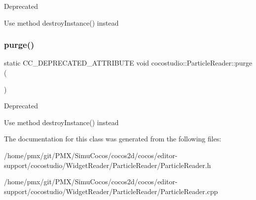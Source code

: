 \begin{DoxyRefDesc}{Deprecated}
\item[\hyperlink{deprecated__deprecated000098}{Deprecated}]Use method destroy\+Instance() instead \end{DoxyRefDesc}
\mbox{\label{classcocostudio_1_1ParticleReader_a673cbfc148ac6e11b405d3a8b2ed2603}} 
\subsubsection{\texorpdfstring{purge()}{purge()}\hspace{0.1cm}{\footnotesize\ttfamily [2/2]}}
{\footnotesize\ttfamily static C\+C\+\_\+\+D\+E\+P\+R\+E\+C\+A\+T\+E\+D\+\_\+\+A\+T\+T\+R\+I\+B\+U\+TE void cocostudio\+::\+Particle\+Reader\+::purge (\begin{DoxyParamCaption}{ }\end{DoxyParamCaption})\hspace{0.3cm}{\ttfamily [static]}}

\begin{DoxyRefDesc}{Deprecated}
\item[\hyperlink{deprecated__deprecated000333}{Deprecated}]Use method destroy\+Instance() instead \end{DoxyRefDesc}


The documentation for this class was generated from the following files\+:\begin{DoxyCompactItemize}
\item 
/home/pmx/git/\+P\+M\+X/\+Simu\+Cocos/cocos2d/cocos/editor-\/support/cocostudio/\+Widget\+Reader/\+Particle\+Reader/Particle\+Reader.\+h\item 
/home/pmx/git/\+P\+M\+X/\+Simu\+Cocos/cocos2d/cocos/editor-\/support/cocostudio/\+Widget\+Reader/\+Particle\+Reader/Particle\+Reader.\+cpp\end{DoxyCompactItemize}
